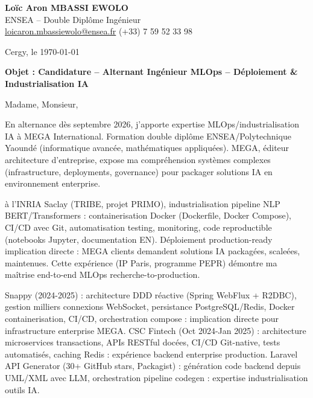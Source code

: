 \documentclass[a4paper,11pt]{article}
\begin{document}
\noindent \textbf{Lo\"ic Aron MBASSI EWOLO} \\
ENSEA -- Double Dipl\^ome Ing\'enieur \\
\href{mailto:loicaron.mbassiewolo@ensea.fr}{loicaron.mbassiewolo@ensea.fr} \quad (+33) 7 59 52 33 98

\vspace{1em}
\noindent Cergy, le \today

\vspace{1em}
\noindent \textbf{Objet : Candidature -- Alternant Ing\'enieur MLOps -- D\'eploiement \& Industrialisation IA}

\vspace{1.5em}
\noindent Madame, Monsieur,

\vspace{0.8em}
\noindent En alternance d\`es septembre 2026, j'apporte expertise MLOps/industrialisation IA \`a MEGA International. Formation double dipl\^ome ENSEA/Polytechnique Yaound\'e (informatique avanc\'ee, math\'ematiques appliqu\'ees). MEGA, \'editeur architecture d'entreprise, expose ma compr\'ehension syst\`emes complexes (infrastructure, deployments, governance) pour packager solutions IA en environnement enterprise.

\vspace{0.8em}
\noindent \`a l'INRIA Saclay (TRIBE, projet PRIMO), industrialisation pipeline NLP BERT/Transformers : containerisation Docker (Dockerfile, Docker Compose), CI/CD avec Git, automatisation testing, monitoring, code reproductible (notebooks Jupyter, documentation EN). D\'eploiement production-ready implication directe : MEGA clients demandent solutions IA packag\'ees, scale\'ees, maintenues. Cette exp\'erience (IP Paris, programme PEPR) d\'emontre ma ma\^itrise end-to-end MLOps recherche-to-production.

\vspace{0.8em}
\noindent Snappy (2024-2025) : architecture DDD r\'eactive (Spring WebFlux + R2DBC), gestion milliers connexions WebSocket, persistance PostgreSQL/Redis, Docker containerisation, CI/CD, orchestration compose : implication directe pour infrastructure enterprise MEGA. CSC Fintech (Oct 2024-Jan 2025) : architecture microservices transactions, APIs RESTful doc\'ees, CI/CD Git-native, tests automatis\'es, caching Redis : exp\'erience backend enterprise production. Laravel API Generator (30+ GitHub stars, Packagist) : g\'en\'eration code backend depuis UML/XML avec LLM, orchestration pipeline codegen : expertise industrialisation outils IA.
\end{document}
